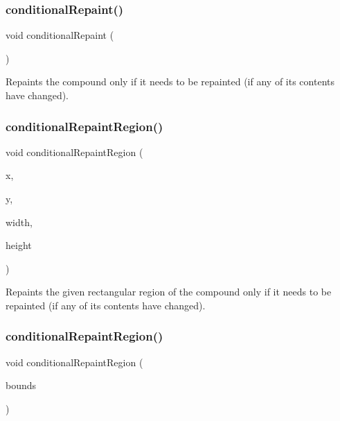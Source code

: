 \subsubsection{\texorpdfstring{conditional\+Repaint()}{conditionalRepaint()}}
{\footnotesize\ttfamily void conditional\+Repaint (\begin{DoxyParamCaption}{ }\end{DoxyParamCaption})\hspace{0.3cm}{\ttfamily [virtual]}}



Repaints the compound only if it needs to be repainted (if any of its contents have changed). 

\mbox{\label{classsgl_1_1GCompound_aedd4b792311d946eeaf44b0de337a408}} 
\subsubsection{\texorpdfstring{conditional\+Repaint\+Region()}{conditionalRepaintRegion()}\hspace{0.1cm}{\footnotesize\ttfamily [1/2]}}
{\footnotesize\ttfamily void conditional\+Repaint\+Region (\begin{DoxyParamCaption}\item[{int}]{x,  }\item[{int}]{y,  }\item[{int}]{width,  }\item[{int}]{height }\end{DoxyParamCaption})\hspace{0.3cm}{\ttfamily [virtual]}}



Repaints the given rectangular region of the compound only if it needs to be repainted (if any of its contents have changed). 

\mbox{\label{classsgl_1_1GCompound_a3932a12278752db368e24fa404e446aa}} 
\subsubsection{\texorpdfstring{conditional\+Repaint\+Region()}{conditionalRepaintRegion()}\hspace{0.1cm}{\footnotesize\ttfamily [2/2]}}
{\footnotesize\ttfamily void conditional\+Repaint\+Region (\begin{DoxyParamCaption}\item[{const \mbox{\hyperlink{structsgl_1_1GRectangle}{G\+Rectangle}} \&}]{bounds }\end{DoxyParamCaption})\hspace{0.3cm}{\ttfamily [virtual]}}



